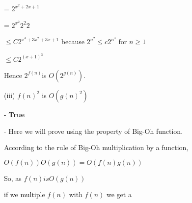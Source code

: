 \documentclass[letterpaper,portrait,12pt]{article}
\begin{document}
\begin{flushleft}
	= $2^{x^2+2x+1}$
\end{flushleft}


\begin{flushleft}
	= $2^{x^2} 2^2 2$
\end{flushleft}


\begin{flushleft}
	$\le C 2^{x^3 + 3x^2+3x +1}$ because $2^{n^2} \le c  2^{n^3}$ for $n\ge1$
\end{flushleft}


\begin{flushleft}
	$\le C 2^{(x+1)^3}$
\end{flushleft}


\begin{flushleft}
Hence  $2^{f(n)}$is $O(2^{g(n)})$. 
\end{flushleft}


\begin{flushleft}

\end{flushleft}


\begin{flushleft}
(iii) ${f(n)}^2$ is $O({g(n)}^2)$
\end{flushleft}


\begin{flushleft}
- \textbf{True}
\end{flushleft}


\begin{flushleft}
- Here we will prove using the property of Big-Oh function.
\end{flushleft}


\begin{flushleft}
According to the rule of Big-Oh multiplication by a function,
\end{flushleft}


\begin{flushleft}
$O(f(n)) O(g(n)) = O(f(n)g(n))$
\end{flushleft}


\begin{flushleft}

\end{flushleft}


\begin{flushleft}
So, as $f(n) is O(g(n))
$
\end{flushleft}


\begin{flushleft}
if we multiple $f(n) 
$ with $f(n) 
$ we get a 
\end{flushleft}
\end{document}
